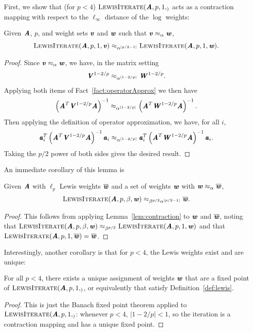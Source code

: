 First, we show that (for $p < 4$) $\textsc{LewisIterate}(\AA, p, 1, _)$ acts as a
contraction mapping with respect to the $\ell_\infty$ distance of the $\log$ weights:
\begin{lemma}
\label{lem:contraction}
Given $\AA$, $p$, and weight sets $\vv$ and $\ww$ such that $\vv \approx_{\alpha} \ww$,
\begin{equation*}
\textsc{LewisIterate}(\AA, p, 1, \vv) \approx_{\alpha^{|p/2 - 1|}} \textsc{LewisIterate}(\AA, p, 1, \ww).
\end{equation*}
\end{lemma}
\begin{proof}
Since $\vv \approx_{\alpha} \ww$, we have, in the matrix setting
\begin{equation*}
\VV^{1 - 2/p} \approx_{\alpha^{|1 - 2/p|}} \WW^{1 - 2/p}.
\end{equation*}
Applying both items of Fact~\ref{fact:operatorApprox} we then have
\begin{equation*}
\left( \AA^T \VV^{1 - 2/p} \AA \right)^{-1} \approx_{\alpha^{|1-2/p|}} \left( \AA^T \WW^{1 - 2/p} \AA \right)^{-1}.
\end{equation*}
Then applying the definition of operator approximation, we have, for all $i$,
\begin{equation*}
\aa_i^T \left( \AA^T \VV^{1 - 2/p} \AA \right)^{-1} \aa_i \approx_{\alpha^{|1-2/p|}} \aa_i^T \left( \AA^T \WW^{1 - 2/p} \AA \right)^{-1} \aa_i.
\end{equation*}
Taking the $p/2$ power of both sides gives the desired result.
\end{proof}
An immediate corollary of this lemma is
\begin{corollary}
\label{cor:convergence}
Given $\AA$ with $\ell_p$ Lewis weights $\wwbar$ and a set of weights $\ww$ with $\ww \approx_{\alpha} \wwbar$,
\begin{equation*}
\textsc{LewisIterate}(\AA, p, \beta, \ww) \approx_{\beta^{p/2} \alpha^{|p/2 - 1|}} \wwbar.
\end{equation*}
\end{corollary}
\begin{proof}
This follows from applying Lemma~\ref{lem:contraction} to $\ww$ and $\wwbar$, noting that
$\textsc{LewisIterate}(\AA, p, \beta, \ww) \approx_{\beta^{p/2}} \textsc{LewisIterate}(\AA, p, 1, \ww)$ and that
$\textsc{LewisIterate}(\AA, p, 1, \wwbar) = \wwbar$.
\end{proof}

Interestingly, another corollary is that for $p < 4$, the Lewis weights exist and are unique:
\begin{corollary}
\label{cor:itlewis}
For all $p < 4$, there exists a unique assignment of weights $\ww$ that are a fixed point of
$\textsc{LewisIterate}(\AA, p, 1, _)$, or equivalently that satisfy Definition~\ref{def:lewis}.
\end{corollary}
\begin{proof}
This is just the Banach fixed point theorem applied to $\textsc{LewisIterate}(\AA, p, 1, _)$:
whenever $p < 4$, $|1-2/p| < 1$, so the iteration is a contraction mapping and has a unique
fixed point.
\end{proof}

